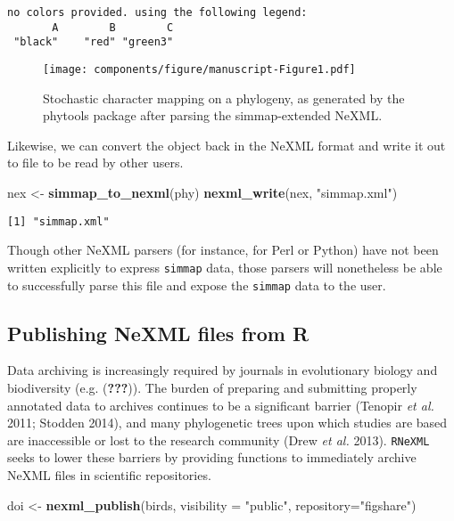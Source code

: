\documentclass[author-year, review, 11pt]{components/elsarticle} %
\makeatletter
\newenvironment{Shaded}{\begin{snugshade}}{\end{snugshade}}
\newcommand{\KeywordTok}[1]{\textcolor[rgb]{0.13,0.29,0.53}{\textbf{{#1}}}}
\newcommand{\DataTypeTok}[1]{\textcolor[rgb]{0.13,0.29,0.53}{{#1}}}
\newcommand{\StringTok}[1]{\textcolor[rgb]{0.31,0.60,0.02}{{#1}}}
\newcommand{\NormalTok}[1]{{#1}}
\def\maxwidth{\ifdim\Gin@nat@width>\linewidth\linewidth
\else\Gin@nat@width\fi}
\let\Oldincludegraphics\includegraphics
\renewcommand{\includegraphics}[1]{\Oldincludegraphics[width=\maxwidth]{#1}}
\makeatother
\begin{document}
\begin{verbatim}
no colors provided. using the following legend:
       A        B        C 
 "black"    "red" "green3" 
\end{verbatim}

\begin{figure}[htbp]
\centering
\texttt{[image: components/figure/manuscript-Figure1.pdf]}
\caption{Stochastic character mapping on a phylogeny, as generated by
the phytools package after parsing the simmap-extended NeXML.}
\end{figure}

Likewise, we can convert the object back in the NeXML format and write
it out to file to be read by other users.

\begin{Shaded}
\begin{Highlighting}[]
\NormalTok{nex <-}\StringTok{ }\KeywordTok{simmap_to_nexml}\NormalTok{(phy) }
\KeywordTok{nexml_write}\NormalTok{(nex, }\StringTok{"simmap.xml"}\NormalTok{)}
\end{Highlighting}
\end{Shaded}

\begin{verbatim}
[1] "simmap.xml"
\end{verbatim}

Though other NeXML parsers (for instance, for Perl or Python) have not
been written explicitly to express \texttt{simmap} data, those parsers
will nonetheless be able to successfully parse this file and expose the
\texttt{simmap} data to the user.

\subsection{Publishing NeXML files from
R}\label{publishing-nexml-files-from-r}

Data archiving is increasingly required by journals in evolutionary
biology and biodiversity (e.g. ({\textbf{???}})). The burden of
preparing and submitting properly annotated data to archives continues
to be a significant barrier (Tenopir \emph{et al.} 2011; Stodden 2014),
and many phylogenetic trees upon which studies are based are
inaccessible or lost to the research community (Drew \emph{et al.}
2013). \texttt{RNeXML} seeks to lower these barriers by providing
functions to immediately archive NeXML files in scientific repositories.

\begin{Shaded}
\begin{Highlighting}[]
\NormalTok{doi <-}\StringTok{ }\KeywordTok{nexml_publish}\NormalTok{(birds, }\DataTypeTok{visibility =} \StringTok{"public"}\NormalTok{, }\DataTypeTok{repository=}\StringTok{"figshare"}\NormalTok{)}
\end{Highlighting}
\end{Shaded}
\end{document}
